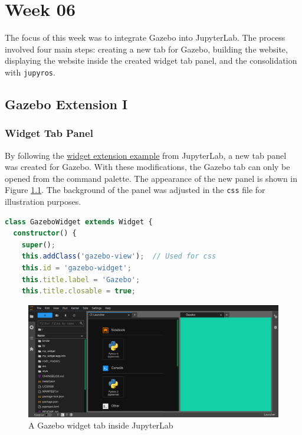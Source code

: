 \chapter{Week 06}

    The focus of this week was to integrate Gazebo into JupyterLab. The process involved four main steps: creating a new tab for Gazebo, building the website, displaying the website inside the created widget tab panel, and the consolidation with \texttt{jupyros}.

\section{Gazebo Extension I}

\subsection{Widget Tab Panel}

    By following the \href{https://github.com/jupyterlab/extension-examples/tree/master/widgets}{widget extension example} from JupyterLab, a new tab panel was created for Gazebo. With these modifications, the Gazebo tab can only be opened from the command palette. The appearance of the new panel is shown in Figure \ref{fig:widgetTab}. The background of the panel was adjusted in the \texttt{css} file for illustration purposes. 
    
    \begin{lstlisting}[language=TypeScript]
class GazeboWidget extends Widget {
  constructor() {
    super();
    this.addClass('gazebo-view');  // Used for css
    this.id = 'gazebo-widget';
    this.title.label = 'Gazebo';
    this.title.closable = true;
    \end{lstlisting}

    \begin{figure}[hb]
        \centering
        \includegraphics[width=0.95\linewidth]{Images/06_widgetTab.png}
        \caption{A Gazebo widget tab inside JupyterLab}
        \label{fig:widgetTab}
    \end{figure}
    

